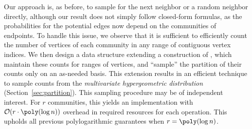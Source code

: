 Our approach is, as before, to sample for the next neighbor or a random neighbor directly,
although our result does not simply follow closed-form formulas,
as the probabilities for the potential edges now depend
on the communities of endpoints.
To handle this issue, we observe that it is sufficient to efficiently count
the number of vertices of each community in any
range of contiguous vertex indices.
We then design a data structure extending a construction of \cite{huge},
which maintain these counts for ranges of vertices,
and ``sample'' the partition of their counts only on an as-needed basis.
This extension results in an efficient technique to sample counts
from the \emph{multivariate hypergeometric distribution} (Section~\ref{sec:partition}).
This sampling procedure may be of independent interest.
For $r$ communities, this yields an implementation with
$ \mathcal{O}(r\cdot \poly(\log n))$ overhead in required resources for each operation.
This upholds all previous polylogarithmic guarantees when $r = \poly(\log n)$.
